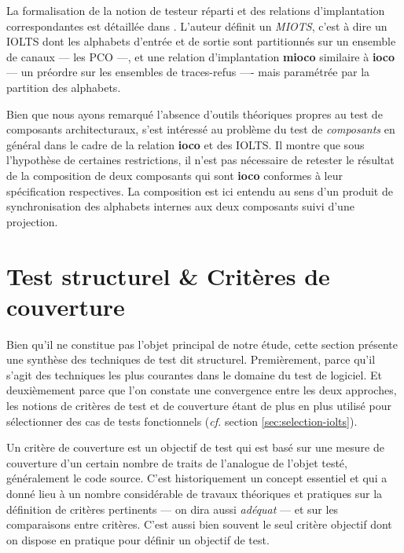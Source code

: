 La formalisation de la notion de testeur r\'eparti et des relations
d'implantation correspondantes est d\'etaill\'ee dans
\cite{heerink-miots-test,heerink-factor-miots}. L'auteur d\'efinit un
\emph{MIOTS}, c'est \`a dire un \textsf{IOLTS} dont les alphabets d'entr\'ee
et de sortie sont partitionn\'es sur un ensemble de canaux --- les
PCO ---, et une relation d'implantation \textbf{mioco} similaire \`a
\textbf{ioco} --- un pr\'eordre sur les ensembles de traces-refus
---- mais param\'etr\'ee par la partition des alphabets. 

Bien que nous ayons remarqu\'e l'absence d'outils th\'eoriques
propres au test de composants architecturaux,
\cite{composition-testing-ioco} s'est int\'eress\'e au probl\`eme
du test de \emph{composants} en g\'en\'eral dans le cadre de la
relation \textbf{ioco} et des \textsf{IOLTS}. Il montre que sous l'hypoth\`ese
de certaines restrictions, il n'est pas n\'ecessaire de retester
le r\'esultat de la composition de deux composants qui sont
\textbf{ioco} conformes \`a leur sp\'ecification respectives. La
composition est ici entendu au sens d'un produit de synchronisation
des alphabets internes aux deux composants suivi d'une projection.

\section{Test structurel \& Crit\`eres de couverture}
\label{sec:test-structurel}

Bien qu'il ne constitue pas l'objet principal de notre \'etude, cette
section pr\'esente une synth\`ese des techniques de test dit
structurel. Premi\`erement, parce qu'il s'agit des techniques les
plus courantes dans le domaine du test de logiciel. Et deuxi\`emement
parce que l'on constate une convergence entre les deux approches, les notions de crit\`eres de test et de couverture \'etant
de plus en plus utilis\'e pour s\'electionner des cas de tests
fonctionnels (\emph{cf.} section \ref{sec:selection-iolts}). 

Un crit\`ere de couverture est un objectif de
test qui est bas\'e sur une mesure de couverture d'un certain nombre
de traits de l'analogue de l'objet test\'e, g\'en\'eralement le
code source. C'est historiquement un concept
essentiel et qui a donn\'e lieu \`a un nombre consid\'erable de
travaux th\'eoriques et pratiques sur la d\'efinition de crit\`eres
pertinents --- on dira aussi \emph{ad\'equat} --- et
sur les comparaisons entre crit\`eres. C'est aussi bien souvent le
seul crit\`ere objectif dont on dispose en pratique pour d\'efinir
un objectif de test. 

